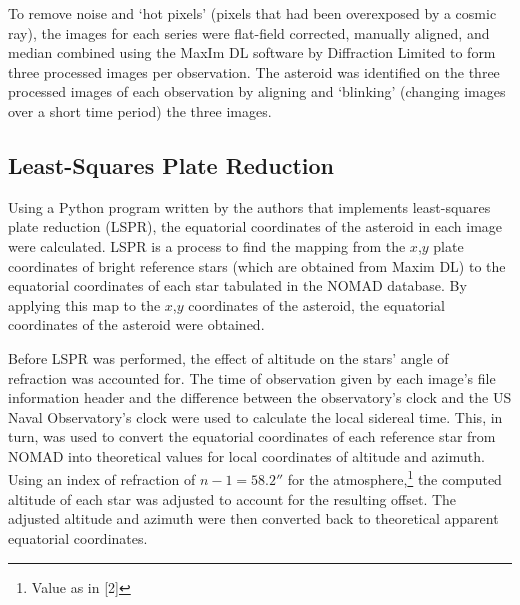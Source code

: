 \documentclass[12pt,journal,compsoc]{IEEEtran}
\begin{document}
To remove noise and `hot pixels' (pixels that had been overexposed by a cosmic ray), 
the images for each series were flat-field corrected, manually aligned, and median combined 
using the MaxIm DL software by Diffraction Limited to form three processed images per observation.
The asteroid was identified on the three processed images of each observation 
by aligning and `blinking' (changing images over a short time period) the three images.

\subsection{Least-Squares Plate Reduction}
Using a Python program written by the authors that implements least-squares plate reduction (LSPR), 
the equatorial coordinates of the asteroid in each image were calculated.
LSPR is a process to find the mapping from the $x$,$y$ plate coordinates of bright reference stars 
(which are obtained from Maxim DL) to the equatorial coordinates
of each star tabulated in the NOMAD database.
By applying this map to the $x$,$y$ coordinates of the asteroid, the equatorial coordinates of
the asteroid were obtained.

Before LSPR was performed, the effect of altitude on the stars' angle of refraction was accounted for.
The time of observation given by each image's file information header and the difference between the 
observatory's clock and the US Naval Observatory's clock were used to calculate the local sidereal time.
This, in turn, was used to convert the equatorial coordinates of each reference star from NOMAD 
into theoretical values for local coordinates of altitude and azimuth.
Using an index of refraction of $n-1=58.2''$ for the atmosphere,\footnote{Value as in [2]} 
the computed altitude of each star was adjusted to account for the resulting offset.
The adjusted altitude and azimuth were then converted back to theoretical apparent equatorial coordinates.
\end{document}
